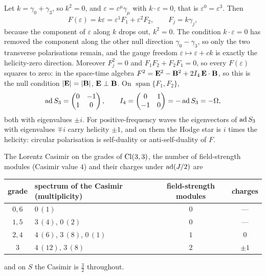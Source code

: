 \begin{example}
\label{ex:univectorwave}
Let $k=\gamma_0+\gamma_3$, so $k^2=0$, and $\varepsilon=\varepsilon^\mu\gamma_\mu$ with $k\cdot\varepsilon=0$, that is $\varepsilon^0=\varepsilon^3$. Then
\[
F(\varepsilon)=k\varepsilon=\varepsilon^1F_1+\varepsilon^2F_2,\qquad F_j=k\gamma_j ,
\]
because the component of $\varepsilon$ along $k$ drops out, $k^2=0$. The condition $k\cdot\varepsilon=0$ has removed the component along the
other null direction $\gamma_0-\gamma_3$, so only the two transverse polarisations remain, and the gauge freedom
$\varepsilon\mapsto\varepsilon+ck$ is exactly the helicity-zero direction. Moreover $F_j^2=0$ and $F_1F_2+F_2F_1=0$, so every $F(\varepsilon)$ squares
to zero: in the space-time algebra $F^2=\mathbf E^2-\mathbf B^2+2I_4\,\mathbf E\cdot\mathbf B$, so this is the null condition $|\mathbf E|=|\mathbf B|$,
$\mathbf E\perp\mathbf B$. On $\operatorname{span}\{F_1,F_2\}$,
\[
\operatorname{ad} S_3=\begin{pmatrix}0&-1\\1&0\end{pmatrix},\qquad I_4=\begin{pmatrix}0&1\\-1&0\end{pmatrix}=-\operatorname{ad} S_3=-\Omega ,
\]
both with eigenvalues $\pm i$. For positive-frequency waves the eigenvectors of $\operatorname{ad} S_3$ with eigenvalues $\mp i$ carry helicity
$\pm1$, and on them the Hodge star is $i$ times the helicity: circular polarisation is self-duality or anti-self-duality of $F$.
\end{example}

\begin{proposition}
\label{prop:censusint}
The Lorentz Casimir on the grades of $\mathrm{Cl}(3,3)$, the number of field-strength modules (Casimir value $4$) and their charges under
$\operatorname{ad}(J/2)$ are
\begin{center}
\begin{tabular}{@{}clcc@{}}
\toprule
grade & spectrum of the Casimir (multiplicity) & field-strength modules & charges\\
\midrule
$0,6$ & $0\,(1)$ & $0$ & ---\\
$1,5$ & $3\,(4)$, $0\,(2)$ & $0$ & ---\\
$2,4$ & $4\,(6)$, $3\,(8)$, $0\,(1)$ & $1$ & $0$\\
$3$ & $4\,(12)$, $3\,(8)$ & $2$ & $\pm1$\\
\bottomrule
\end{tabular}
\end{center}
and on $S$ the Casimir is $\tfrac32$ throughout.
\end{proposition}

